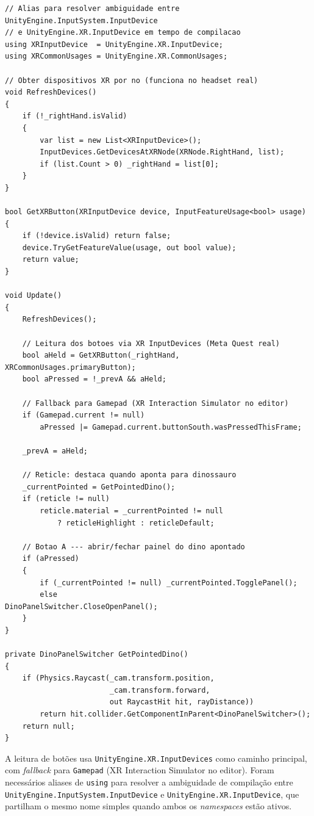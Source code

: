 \documentclass[a4paper,11pt]{report}
\newcommand{\code}[1]{\texttt{#1}}
\begin{document}
\begin{lstlisting}[caption={Excerto de VRInputHandler.cs --- leitura de botões XR e raycast.},
                   label={lst:vrinput}]
// Alias para resolver ambiguidade entre UnityEngine.InputSystem.InputDevice
// e UnityEngine.XR.InputDevice em tempo de compilacao
using XRInputDevice  = UnityEngine.XR.InputDevice;
using XRCommonUsages = UnityEngine.XR.CommonUsages;

// Obter dispositivos XR por no (funciona no headset real)
void RefreshDevices()
{
    if (!_rightHand.isValid)
    {
        var list = new List<XRInputDevice>();
        InputDevices.GetDevicesAtXRNode(XRNode.RightHand, list);
        if (list.Count > 0) _rightHand = list[0];
    }
}

bool GetXRButton(XRInputDevice device, InputFeatureUsage<bool> usage)
{
    if (!device.isValid) return false;
    device.TryGetFeatureValue(usage, out bool value);
    return value;
}

void Update()
{
    RefreshDevices();

    // Leitura dos botoes via XR InputDevices (Meta Quest real)
    bool aHeld = GetXRButton(_rightHand, XRCommonUsages.primaryButton);
    bool aPressed = !_prevA && aHeld;

    // Fallback para Gamepad (XR Interaction Simulator no editor)
    if (Gamepad.current != null)
        aPressed |= Gamepad.current.buttonSouth.wasPressedThisFrame;

    _prevA = aHeld;

    // Reticle: destaca quando aponta para dinossauro
    _currentPointed = GetPointedDino();
    if (reticle != null)
        reticle.material = _currentPointed != null
            ? reticleHighlight : reticleDefault;

    // Botao A --- abrir/fechar painel do dino apontado
    if (aPressed)
    {
        if (_currentPointed != null) _currentPointed.TogglePanel();
        else                         DinoPanelSwitcher.CloseOpenPanel();
    }
}

private DinoPanelSwitcher GetPointedDino()
{
    if (Physics.Raycast(_cam.transform.position,
                        _cam.transform.forward,
                        out RaycastHit hit, rayDistance))
        return hit.collider.GetComponentInParent<DinoPanelSwitcher>();
    return null;
}
\end{lstlisting}

A leitura de botões usa \code{UnityEngine.XR.InputDevices} como caminho
principal, com \textit{fallback} para \code{Gamepad} (XR Interaction Simulator
no editor). Foram necessários aliases de \code{using} para resolver a
ambiguidade de compilação entre \code{UnityEngine.InputSystem.InputDevice}
e \code{UnityEngine.XR.InputDevice}, que partilham o mesmo nome simples
quando ambos os \textit{namespaces} estão ativos.
\end{document}
